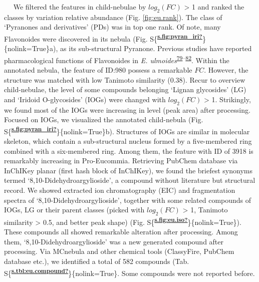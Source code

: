    We filtered the features in child-nebulae by
\textbar{}\(log_{2}(FC)\)\textbar{} \textgreater{} 1 and ranked the
classes by variation relative abundance (Fig.
{\protect\NoHyper\ref{fig:eu.rank}\protect\endNoHyper}). The class of
`Pyranones and derivatives' (PDs) was in top one rank. Of note, many
Flavonoides were discovered in its nebula (Fig.
S\{\textsuperscript{\protect\hyperlink{ref-s.fig:pyran_iri}{\textbf{s.fig:pyran\_iri?}}}\}\{nolink=True\}a),
as its sub-structural Pyranone. Previous studies have reported
pharmacological functions of Flavonoides in \emph{E.
ulmoides}\textsuperscript{\protect\hyperlink{ref-2021cp}{79}--\protect\hyperlink{ref-2019x}{82}}.
Within the annotated nebula, the feature of ID:980 possess a remarkable
\(FC\). However, the structure was matched with low Tanimoto similarity
(0.38). Recur to overview child-nebulae, the level of some compounds
belonging `Lignan glycosides' (LG) and `Iridoid O-glycosides' (IOGs)
were changed with \textbar{}\(log_{2}(FC)\)\textbar{} \textgreater{} 1.
Strikingly, we found most of the IOGs were increasing in level (peak
area) after processing. Focused on IOGs, we visualized the annotated
child-nebula (Fig.
S\{\textsuperscript{\protect\hyperlink{ref-s.fig:pyran_iri}{\textbf{s.fig:pyran\_iri?}}}\}\{nolink=True\}b).
Structures of IOGs are similar in molecular skeleton, which contain a
sub-structural nucleus formed by a five-membered ring combined with a
six-membered ring. Among them, the feature with ID of 3918 is remarkably
increasing in Pro-Eucommia. Retrieving PubChem database via InChIKey
planar (first hash block of InChIKey), we found the briefest synonyms
termed `8,10-Didehydroargylioside', a compound without literature but
structural record. We showed extracted ion chromatography (EIC) and
fragmentation spectra of `8,10-Didehydroargylioside', together with some
related compounds of IOGs, LG or their parent classes (picked with
\textbar{}\(log_{2}(FC)\)\textbar{} \textgreater{} 1, Tanimoto
similarity \textgreater{} 0.5, and better peak shape) (Fig.
S\{\textsuperscript{\protect\hyperlink{ref-s.fig:eu.iso}{\textbf{s.fig:eu.iso?}}}\}\{nolink=True\}).
These compounds all showed remarkable alteration after processing. Among
them, `8,10-Didehydroargylioside' was a new generated compound after
processing. Via MCnebula and other chemical tools (ClassyFire, PubChem
database etc.), we identified a total of 582 compounds (Tab.
S\{\textsuperscript{\protect\hyperlink{ref-s.tbl:eu.compound}{\textbf{s.tbl:eu.compound?}}}\}\{nolink=True\}.
Some compounds were not reported before.

